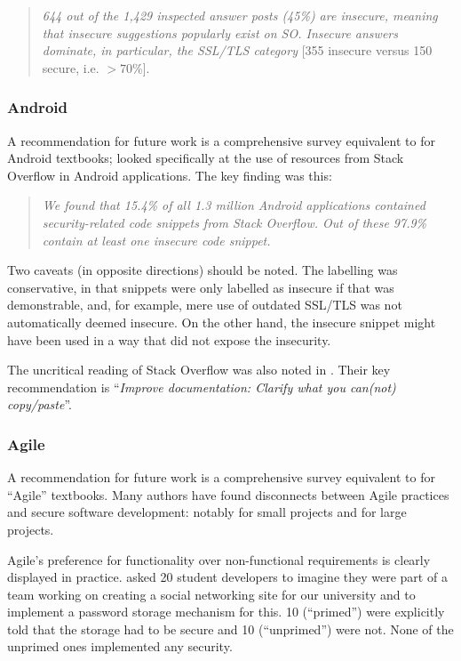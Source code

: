 \documentclass[conference]{IEEEtran}
\begin{document}
\begin{quote}
{\emph{644 out of the 1,429 inspected answer posts
(45\%) are insecure, meaning that insecure suggestions
popularly exist on SO. Insecure answers dominate, in
particular, the SSL/TLS category}} [355 insecure versus 150 secure, i.e. $>70$\%].
\end{quote} 

\subsubsection{Android}\label{sec:Android}

A recommendation for future work is a comprehensive survey equivalent to \cite{Drop2019} for Android textbooks; \cite{Fischeretal2017a} looked specifically at the use of resources from Stack Overflow in Android applications. The key finding was this:
\begin{quote}
{\emph{We found that 15.4\% of all 1.3 million Android applications
contained security-related code snippets from
Stack Overflow. Out of these 97.9\% contain at least one
insecure code snippet.}}
\end{quote}

Two caveats (in opposite directions) should be noted. The labelling was conservative, in that snippets were only labelled as insecure if that was demonstrable, and, for example, mere use of outdated SSL/TLS was not automatically deemed insecure. On the other hand, the insecure snippet might have been used in a way that did not expose the insecurity.
\par
The uncritical reading of Stack Overflow was also noted in \cite[Slide 29]{Votipkaetal2019a}. Their key recommendation  \cite[Slide 32]{Votipkaetal2019a} is ``{\emph{Improve documentation: Clarify what you can(not) copy/paste}}''. 

\subsubsection{Agile}

A recommendation for future work is a comprehensive survey equivalent to \cite{Drop2019} for ``Agile'' textbooks. Many authors have found disconnects between Agile practices and secure software development: notably \cite{Bartsch2011a} for small projects and \cite{vanderHeijden:2018:EPS:3239235.3267426} for large projects.
\par
Agile's preference for functionality over non-functional requirements is clearly displayed in practice. \cite{Naiakshinaetal2017a} asked 20 student developers to imagine they
were part of a team working on creating a social networking site for
our university and to implement a password storage mechanism for this. 10 (``primed'') were explicitly told that the storage had to be secure and 10 (``unprimed'') were not. None of the unprimed ones implemented any security.
\end{document}
